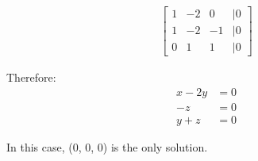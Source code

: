\documentclass[paper=a4, fontsize=10pt]{scrartcl} %
\begin{document}
\begin{align*}
	\begin{bmatrix}
		1 & -2 &  0 &| 0 \\
		1 & -2 & -1 &| 0 \\
		0 &  1 &  1 &| 0
	\end{bmatrix}
\end{align*}

Therefore: \\

\begin{align*}
	x - 2y &= 0 \\
	-z &= 0 \\
	y + z &= 0
\end{align*}

In this case, (0, 0, 0) is the only solution.
\end{document}
